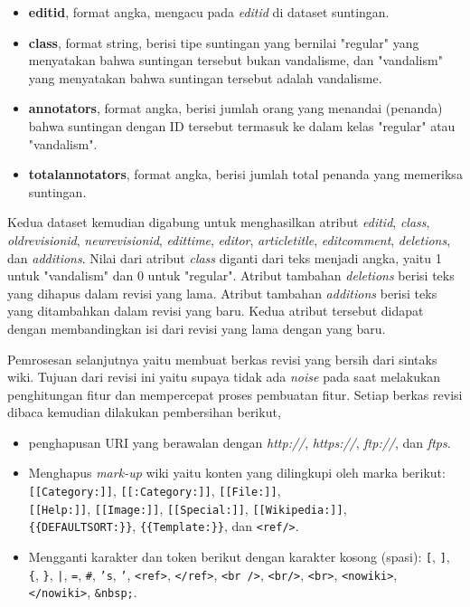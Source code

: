 \begin{itemize}
	\item \textbf{editid}, format angka, mengacu pada \textit{editid} di
	dataset suntingan.
	\item \textbf{class}, format string, berisi tipe suntingan yang
	bernilai "regular" yang menyatakan bahwa suntingan tersebut bukan
	vandalisme, dan "vandalism" yang menyatakan bahwa suntingan tersebut
	adalah vandalisme.
	\item \textbf{annotators}, format angka, berisi jumlah orang yang
	menandai (penanda) bahwa suntingan dengan ID tersebut termasuk ke dalam
	kelas "regular" atau "vandalism".
	\item \textbf{totalannotators}, format angka, berisi jumlah total penanda yang memeriksa suntingan.
\end{itemize}

Kedua dataset kemudian digabung untuk menghasilkan atribut \textit{editid},
\textit{class}, \textit{oldrevisionid}, \textit{newrevisionid},
\textit{edittime}, \textit{editor}, \textit{articletitle},
\textit{editcomment}, \textit{deletions}, dan \textit{additions}.
Nilai dari atribut \textit{class} diganti dari teks menjadi angka, yaitu 1
untuk "vandalism" dan 0 untuk "regular".
Atribut tambahan \textit{deletions} berisi teks yang dihapus dalam revisi yang
lama.
Atribut tambahan \textit{additions} berisi teks yang ditambahkan dalam revisi
yang baru.
Kedua atribut tersebut didapat dengan membandingkan isi dari revisi yang lama
dengan yang baru.

Pemrosesan selanjutnya yaitu membuat berkas revisi yang bersih dari sintaks
wiki.
Tujuan dari revisi ini yaitu supaya tidak ada \textit{noise} pada saat
melakukan penghitungan fitur dan mempercepat proses pembuatan fitur.
Setiap berkas revisi dibaca kemudian dilakukan pembersihan berikut,

\begin{itemize}
\item penghapusan URI yang berawalan dengan
\textit{http://}, \textit{https://}, \textit{ftp://}, dan \textit{ftps}.
\item Menghapus \textit{mark-up} wiki yaitu konten yang dilingkupi oleh marka
berikut:
\texttt{[[Category:]]}, \texttt{[[:Category:]]}, \texttt{[[File:]]}, \\
\texttt{[[Help:]]}, \texttt{[[Image:]]}, \texttt{[[Special:]]},
\texttt{[[Wikipedia:]]}, \\
\texttt{\{\{DEFAULTSORT:\}\}}, \texttt{\{\{Template:\}\}}, dan \texttt{<ref/>}.

\item Mengganti karakter dan token berikut dengan karakter kosong (spasi):
\texttt{[}, \texttt{]}, \texttt{\{}, \texttt{\}}, \texttt{|}, \texttt{=},
\texttt{\#}, \texttt{'s}, \texttt{'}, \texttt{<ref>}, \texttt{</ref>},
\texttt{<br />}, \texttt{<br/>}, \texttt{<br>}, \texttt{<nowiki>},
\texttt{</nowiki>}, \texttt{\&nbsp;}.
\end{itemize}
